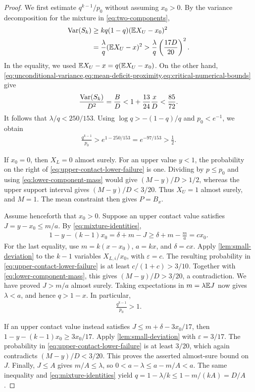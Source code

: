 \begin{proof}
We first estimate $q^{k-1}/p_0$ without assuming $x_0>0$.
By the variance decomposition for the mixture in \cref{eq:two-components},
\begin{align*}
 \operatorname{Var}(S_k)
 &\ge kq(1-q)(\mathbb E X_U-x_0)^2\\
 &=\frac{\lambda}{q}(\mathbb E X_U-x)^2
 >\frac{\lambda}{q}\left(\frac{17D}{20}\right)^2.
\end{align*}
In the equality, we used $\mathbb E X_U-x=q(\mathbb E X_U-x_0)$.
On the other hand, \cref{eq:unconditional-variance,eq:mean-deficit-proximity,eq:critical-numerical-bounds} give
\begin{align*}
 \frac{\operatorname{Var}(S_k)}{D^2}=\frac BD
 <1+\frac{13}{24}\frac xD<\frac{85}{72}.
\end{align*}
It follows that $\lambda/q<250/153$.
Using $\log q>-(1-q)/q$ and $p_0<e^{-1}$, we obtain
\begin{align}
 \frac{q^{k-1}}{p_0}>e^{1-250/153}=e^{-97/153}>\frac12.
 \label{eq:lower-component-mass}
\end{align}

If $x_0=0$, then $X_L=0$ almost surely.
For an upper value $y<1$, the probability on the right of \cref{eq:upper-contact-lower-failure} is one.
Dividing by $p\le p_0$ and using \cref{eq:lower-component-mass} would give $(M-y)/D>1/2$, whereas the upper support interval gives $(M-y)/D<3/20$.
Thus $X_U=1$ almost surely, and $M=1$.
The mean constraint then gives $P=B_x$.

Assume henceforth that $x_0>0$.
Suppose an upper contact value satisfies $J=y-x_0\le m/a$.
By \cref{eq:mixture-identities},
\begin{align*}
 1-y-(k-1)x_0
 =\delta+m-J
 \ge\delta+m-\frac ma
 =cx_0.
\end{align*}
For the last equality, use $m=k(x-x_0)$, $a=kx$, and $\delta=cx$.
Apply \cref{lem:small-deviation} to the $k-1$ variables $X_{L,i}/x_0$, with $\varepsilon=c$.
The resulting probability in \cref{eq:upper-contact-lower-failure} is at least $c/(1+c)>3/10$.
Together with \cref{eq:lower-component-mass}, this gives $(M-y)/D>3/20$, a contradiction.
We have proved $J>m/a$ almost surely.
Taking expectations in $m=\lambda\mathbb E J$ now gives $\lambda<a$, and hence $q>1-x$.
In particular,
\begin{align*}
 \frac{q^{k-1}}{p_0}>1.
\end{align*}

If an upper contact value instead satisfies $J\le m+\delta-3x_0/17$, then
$1-y-(k-1)x_0\ge3x_0/17$.
Apply \cref{lem:small-deviation} with $\varepsilon=3/17$.
The probability in \cref{eq:upper-contact-lower-failure} is at least $3/20$, which again contradicts $(M-y)/D<3/20$.
This proves the asserted almost-sure bound on $J$.
Finally, $J\le A$ gives $m/A\le\lambda$, so $0<a-\lambda\le a-m/A<a$.
The same inequality and \cref{eq:mixture-identities} yield
$q=1-\lambda/k\le1-m/(kA)=D/A$.
\end{proof}

